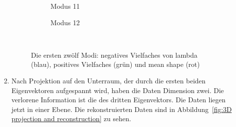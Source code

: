 \documentclass[]{report}
\begin{document}
\begin{enumerate}
\begin{enumerate}
\begin{figure}[tbp!]
				\quad
				\begin{subfigure}{0.3\textwidth}
					\centering
					
					\caption{Modus 11}
					\label{fig:mode11}
				\end{subfigure}	
				\quad
				\begin{subfigure}{0.3\textwidth}
					\centering
					
					\caption{Modus 12}
					\label{fig:mode12}
				\end{subfigure}	
				\\
				\caption{Die ersten zwölf Modi: negatives Vielfaches von lambda (blau), positives Vielfaches (grün) und mean shape (rot)}
				\label{fig:modi}
			\end{figure}
				\item
				Nach Projektion auf den Unterraum, der durch die ersten beiden Eigenvektoren aufgespannt wird, haben die Daten Dimension zwei. Die verlorene Information ist die des dritten Eigenvektors. Die Daten liegen jetzt in einer Ebene. Die rekonstruierten Daten sind in Abbildung~\ref{fig:3D projection and reconstruction} zu sehen.
				
			\end{enumerate}
			

\end{enumerate}
\end{document}
